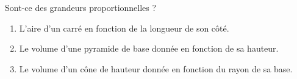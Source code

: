 
\begin{exercice}\label{exo2smath-0186}

    Sont-ce des grandeurs proportionnelles ?
    \begin{enumerate}
        \item
            L'aire d'un carré en fonction de la longueur de son côté.
        \item
            Le volume d'une pyramide de base donnée en fonction de sa hauteur.
        \item
            Le volume d'un cône de hauteur donnée en fonction du rayon de sa base.
    \end{enumerate}

\end{exercice}
